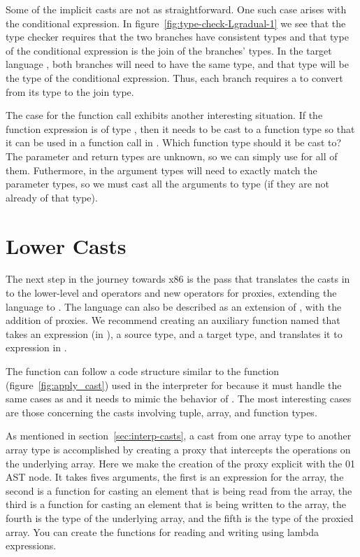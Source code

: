 \documentclass[7x10]{TimesAPriori_MIT}%
\def\racketEd{0}
\def\pythonEd{1}
\def\edition{0}
\newcommand{\racket}[1]{{\if\edition\racketEd{#1}\fi}}
\newcommand{\python}[1]{{\if\edition\pythonEd #1\fi}}
\numberwithin{theorem}{chapter}
\numberwithin{definition}{chapter}
\numberwithin{equation}{chapter}
\begin{document}
{Some of the implicit casts are not as straightforward. One such case
arises with the
conditional expression. In figure~\ref{fig:type-check-Lgradual-1} we
see that the type checker requires that the two branches have
consistent types and that type of the conditional expression is the
join of the branches' types. In the target language \LangCast{}, both
branches will need to have the same type, and that type
will be the type of the conditional expression. Thus, each branch requires
a  to convert from its type to the join type.

The case for the function call exhibits another interesting situation. If
the function expression is of type \CANYTY{}, then it needs to be cast
to a function type so that it can be used in a function call in
\LangCast{}. Which function type should it be cast to? The parameter
and return types are unknown, so we can simply use \CANYTY{} for all
of them. Futhermore, in \LangCast{} the argument types will need to
exactly match the parameter types, so we must cast all the arguments
to type \CANYTY{} (if they are not already of that type).

\fi}


\section{Lower Casts}
\label{sec:lower_casts}

The next step in the journey towards x86 is the 
pass that translates the casts in \LangCast{} to the lower-level
 and  operators and new operators for
proxies, extending the \LangLam{} language to \LangProxy{}.
The \LangProxy{} language can also be described as an extension of
\LangAny{}, with the addition of proxies. We recommend creating an
auxiliary function named  that takes an expression
(in \LangCast{}), a source type, and a target type, and translates it
to expression in \LangProxy{}.

The  function can follow a code structure similar to
the  function (figure~\ref{fig:apply_cast}) used in
the interpreter for \LangCast{} because it must handle the same cases
as  and it needs to mimic the behavior of
. The most interesting cases are those concerning
the casts involving tuple, array, and function types.

As mentioned in section~\ref{sec:interp-casts}, a cast from one array
type to another array type is accomplished by creating a proxy that
intercepts the operations on the underlying array. Here we make the
creation of the proxy explicit with the
\racket{}\python{} AST node. It
takes fives arguments, the first is an expression for the array, the
second is a function for casting an element that is being read from
the array, the third is a function for casting an element that is
being written to the array, the fourth is the type of the underlying
array, and the fifth is the type of the proxied array.  You can create
the functions for reading and writing using lambda expressions.
\end{document}
